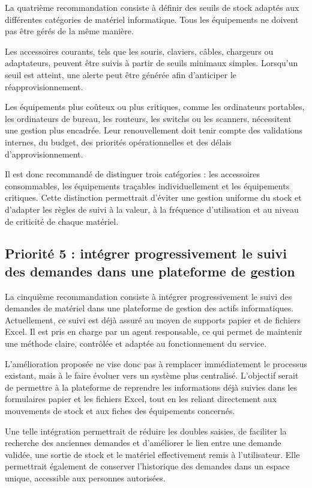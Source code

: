 \documentclass[12pt,a4paper]{report}
\begin{document}
La quatrième recommandation consiste à définir des seuils de stock adaptés aux différentes catégories de matériel informatique. Tous les équipements ne doivent pas être gérés de la même manière.

Les accessoires courants, tels que les souris, claviers, câbles, chargeurs ou adaptateurs, peuvent être suivis à partir de seuils minimaux simples. Lorsqu'un seuil est atteint, une alerte peut être générée afin d'anticiper le réapprovisionnement.

Les équipements plus coûteux ou plus critiques, comme les ordinateurs portables, les ordinateurs de bureau, les routeurs, les switchs ou les scanners, nécessitent une gestion plus encadrée. Leur renouvellement doit tenir compte des validations internes, du budget, des priorités opérationnelles et des délais d'approvisionnement.

Il est donc recommandé de distinguer trois catégories : les accessoires consommables, les équipements traçables individuellement et les équipements critiques. Cette distinction permettrait d'éviter une gestion uniforme du stock et d'adapter les règles de suivi à la valeur, à la fréquence d'utilisation et au niveau de criticité de chaque matériel.

\subsection{Priorité 5 : intégrer progressivement le suivi des demandes dans une plateforme de gestion}

La cinquième recommandation consiste à intégrer progressivement le suivi des demandes de matériel dans une plateforme de gestion des actifs informatiques. Actuellement, ce suivi est déjà assuré au moyen de supports papier et de fichiers Excel. Il est pris en charge par un agent responsable, ce qui permet de maintenir une méthode claire, contrôlée et adaptée au fonctionnement du service.

L'amélioration proposée ne vise donc pas à remplacer immédiatement le processus existant, mais à le faire évoluer vers un système plus centralisé. L'objectif serait de permettre à la plateforme de reprendre les informations déjà suivies dans les formulaires papier et les fichiers Excel, tout en les reliant directement aux mouvements de stock et aux fiches des équipements concernés.

Une telle intégration permettrait de réduire les doubles saisies, de faciliter la recherche des anciennes demandes et d'améliorer le lien entre une demande validée, une sortie de stock et le matériel effectivement remis à l'utilisateur. Elle permettrait également de conserver l'historique des demandes dans un espace unique, accessible aux personnes autorisées.
\end{document}

